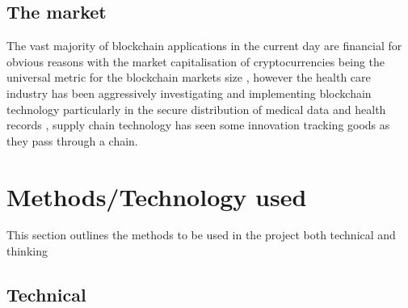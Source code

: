 \documentclass[12pt]{report}
\begin{document}

\section{The market}

The vast majority of blockchain applications in the current day are financial for obvious reasons with the market capitalisation of cryptocurrencies being the universal metric for the blockchain markets size \cite{wood_2021}, however the health care industry has been aggressively investigating and implementing blockchain technology particularly in the secure distribution of medical data and health records \cite{8167115}, supply chain technology has seen some innovation tracking goods as they pass through a chain. 

\chapter{Methods/Technology used}

This section outlines the methods to be used in the project both technical and thinking

\section{Technical}
\end{document}
